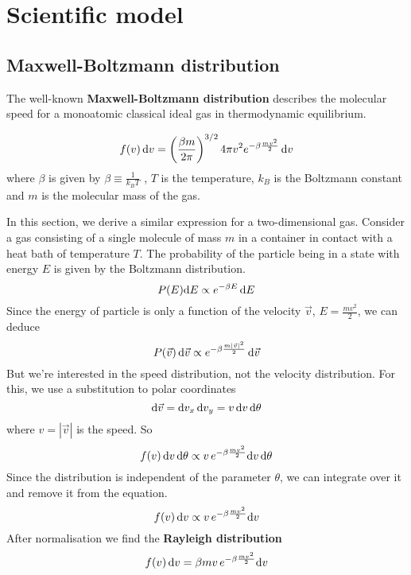 \section{Scientific model}
\subsection{Maxwell-Boltzmann distribution}

The well-known \textbf{Maxwell-Boltzmann distribution} describes the molecular 
speed for a monoatomic classical ideal gas in thermodynamic equilibrium.

$$
f(v)\, \mathrm d v = \left( \frac{\beta m}{2 \pi} \right)^{3/2} 4 \pi v^2 e^{-\beta 
\frac{mv^2}{2}} \, \mathrm d v
$$
where $\beta$ is given by
\begin{math}
\beta \equiv \frac{1}{k_BT}
\end{math}
, $T$ is the temperature, $k_B$ is the Boltzmann constant and $m$ is the 
molecular mass of the gas.

In this section, we derive a similar expression for a two-dimensional gas.
Consider a gas consisting of a single molecule of mass $m$ in a container in 
contact with a heat bath of temperature $T$. The probability of the particle 
being in a state with energy $E$ is given by the Boltzmann distribution.
$$
P(E) \mathrm d E \propto e^{-\beta E}\, \mathrm d E
$$
Since the energy of particle is only a function of the velocity $\vec{v}$, $E = 
\frac{mv^2}{2}$, we can deduce
$$
P(\vec v)\,\mathrm d{\vec v} \propto e^{- \beta \frac{m |\vec v|^2}{2}}\,\mathrm d\vec v
$$
But we're interested in the speed distribution, not the velocity distribution.  
For this, we use a substitution to polar coordinates
$$
\mathrm d \vec{v} = \mathrm d v_x\,\mathrm d v_y = v\,\mathrm d v\,\mathrm d \theta
$$
where $v=|\vec{v}|$ is the speed. So
$$
f(v)\,\mathrm d v\,\mathrm d \theta \propto v\,e^{- \beta \frac{mv^2}{2}} \mathrm d v\,\mathrm d 
\theta
$$
Since the distribution is independent of the parameter $\theta$, we can 
integrate over it and remove it from the equation.
$$
f(v)\,\mathrm d v\propto v\,e^{- \beta \frac{mv^2}{2}} \mathrm d v
$$
After normalisation we find the \textbf{Rayleigh distribution}
$$
f(v)\,\mathrm d v=\beta m v\,e^{-\beta \frac{mv^2}{2}} \mathrm d v
$$

